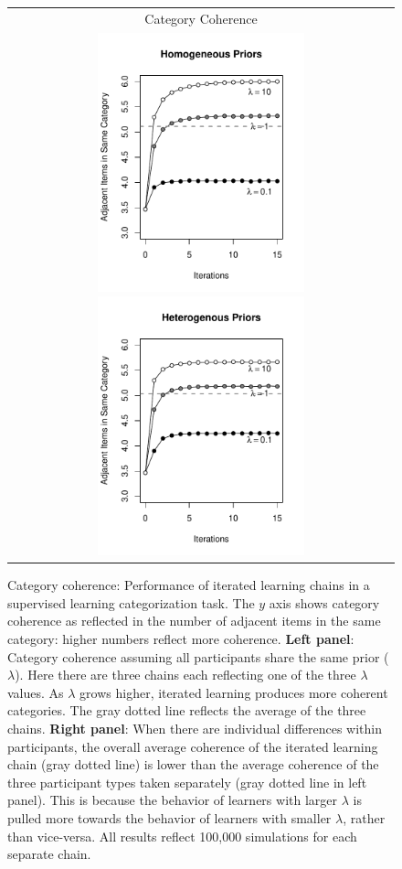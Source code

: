 \documentclass[doc]{apa6}
\begin{document}
\begin{figure}[t]
\begin{center}
\begin{tabular}{c}
\textsf{Category Coherence} \\
\includegraphics[width=6cm]{catcohpure.pdf} \includegraphics[width=6cm]{catcohmixed.pdf}
\end{tabular}
\caption{\small{Category coherence: Performance of iterated learning chains in a supervised learning categorization task. The $y$ axis shows category coherence as reflected in the number of adjacent items in the same category: higher numbers reflect more coherence. {\bf Left panel}: Category coherence assuming all participants share the same prior ($\lambda$). Here there are three chains each reflecting one of the three $\lambda$ values. As $\lambda$ grows higher, iterated learning produces more coherent categories. The gray dotted line reflects the average of the three chains. {\bf Right panel}: When there are individual differences within participants, the overall average coherence of the iterated learning chain (gray dotted line) is lower than the average coherence of the three participant types taken separately (gray dotted line in left panel). This is because the behavior of learners with larger $\lambda$ is pulled more towards the behavior of learners with smaller $\lambda$, rather than vice-versa. All results reflect 100,000 simulations for each separate chain.}}
\label{catcoherence}
\end{center}
\end{figure}
\end{document}
